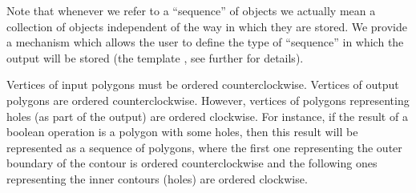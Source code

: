 Note that whenever we refer to a 
``sequence'' of objects we actually mean a collection of objects
independent of the way in which they are stored. We provide  
a mechanism which allows the user to define the type of ``sequence'' in
which the output will be stored (the template
, see further for details).

Vertices of input polygons must be ordered counterclockwise.
Vertices of output polygons are ordered counterclockwise.
However, vertices of polygons representing holes (as part of
the output) are ordered clockwise. 
For instance, if the result of a boolean operation is a polygon with some 
holes, then this result will be represented as a sequence of polygons, 
where the first one
representing the outer boundary of the contour is ordered counterclockwise
and the following ones representing the inner contours (holes) are ordered
clockwise.

